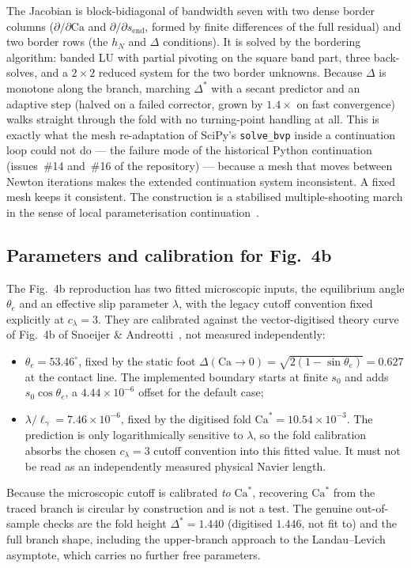 \documentclass[11pt,a4paper]{article}
\newcommand{\Ca}{\mathrm{Ca}}
\newcommand{\lgamma}{\ell_\gamma}
\begin{document}
The Jacobian is block-bidiagonal of bandwidth seven with two dense border
columns ($\partial/\partial\Ca$ and $\partial/\partial s_{\mathrm{end}}$,
formed by finite differences of the full residual) and two border rows (the
$h_N$ and $\Delta$ conditions). It is solved by the bordering algorithm:
banded LU with partial pivoting on the square band part, three back-solves, and
a $2\times2$ reduced system for the two border unknowns. Because $\Delta$ is
monotone along the branch, marching $\Delta^{*}$ with a secant predictor and an
adaptive step (halved on a failed corrector, grown by $1.4\times$ on fast
convergence) walks straight through the fold with no turning-point handling at
all. This is exactly what the mesh re-adaptation of SciPy's
\texttt{solve\_bvp} inside a continuation loop could not do --- the failure
mode of the historical Python continuation (issues~\#14 and~\#16 of the
repository) --- because a mesh that moves between Newton iterations makes the
extended continuation system inconsistent. A fixed mesh keeps it consistent.
The construction is a stabilised multiple-shooting march in the sense of local
parameterisation continuation~\cite{rheinboldt1980}.

\subsection{Parameters and calibration for Fig.~4b}

The Fig.~4b reproduction has two fitted microscopic inputs, the equilibrium
angle $\theta_e$ and an effective slip parameter $\lambda$, with the legacy
cutoff convention fixed explicitly at $c_{\lambda}=3$. They are calibrated
against the vector-digitised theory curve of Fig.~4b of Snoeijer \&
Andreotti~\cite{snoeijer2013}, not measured independently:
\begin{itemize}
  \item $\theta_e = 53.46^{\circ}$, fixed by the static foot
    $\Delta(\Ca \to 0) = \sqrt{2(1 - \sin\theta_e)} = 0.627$ at the
    contact line. The implemented boundary starts at finite $s_0$ and adds
    $s_0\cos\theta_e$, a $4.44\times10^{-6}$ offset for the default case;
  \item $\lambda/\lgamma = 7.46\times10^{-6}$, fixed by the digitised fold
    $\Ca^{*} = 10.54\times10^{-3}$. The prediction is only logarithmically
    sensitive to $\lambda$, so the fold calibration absorbs the chosen
    $c_{\lambda}=3$ cutoff convention into this fitted value. It must not be
    read as an independently measured physical Navier length.
\end{itemize}
Because the microscopic cutoff is calibrated \emph{to} $\Ca^{*}$, recovering
$\Ca^{*}$ from the traced branch is circular by construction and is not a
test. The genuine
out-of-sample checks are the fold height $\Delta^{*} = 1.440$ (digitised
$1.446$, not fit to) and the full branch shape, including the upper-branch
approach to the Landau--Levich asymptote, which carries no further free
parameters.
\end{document}
